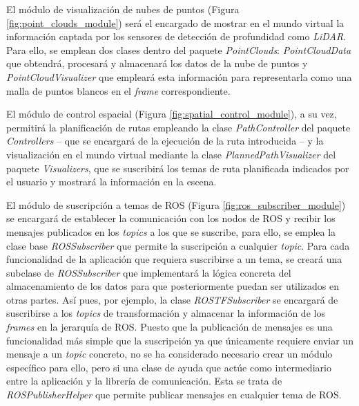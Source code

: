 El módulo de visualización de nubes de puntos (Figura \ref{fig:point_clouds_module}) será el encargado de mostrar en el mundo virtual la información captada 
por los sensores de detección de profundidad como \textit{LiDAR}. Para ello, se emplean dos clases dentro del paquete \textit{PointClouds}: 
\textit{PointCloudData} que obtendrá, 
procesará y almacenará los datos de la nube de puntos y \textit{PointCloudVisualizer} 
que empleará esta información para representarla como una malla de puntos blancos en el \textit{frame} correspondiente.

El módulo de control espacial (Figura \ref{fig:spatial_control_module}), a su vez, permitirá la planificación de rutas empleando la 
clase \textit{PathController} del paquete \textit{Controllers} -- que se encargará de la ejecución de la ruta introducida -- y 
la visualización en el mundo virtual mediante la clase \textit{PlannedPathVisualizer} del paquete \textit{Visualizers}, que se 
suscribirá los temas de ruta planificada indicados por el usuario y mostrará la información en la escena.

El módulo de suscripción a temas de ROS (Figura \ref{fig:ros_subscriber_module})
se encargará de establecer la comunicación con los nodos de ROS y recibir los mensajes 
publicados en los \textit{topics} a los que se suscribe, para ello, se emplea la clase base 
\textit{ROSSubscriber} que permite la suscripción a cualquier \textit{topic}. Para cada funcionalidad de la aplicación que requiera suscribirse 
a un tema, se creará una subclase de \textit{ROSSubscriber} que implementará la lógica concreta del almacenamiento de los datos para que 
posteriormente puedan ser utilizados en otras partes. 
Así pues, por ejemplo, la clase \textit{ROSTFSubscriber} se encargará de suscribirse a los \textit{topics} de transformación y almacenar la información de los \textit{frames} en la jerarquía de ROS.
Puesto que la publicación de mensajes es una funcionalidad más simple que la suscripción ya que únicamente requiere enviar un mensaje a 
un \textit{topic} concreto, no se ha considerado necesario crear un módulo específico para ello, pero si 
una clase de ayuda que actúe como intermediario entre la aplicación y la librería de comunicación. 
Esta se trata de \textit{ROSPublisherHelper} que permite publicar mensajes en cualquier tema de ROS.

